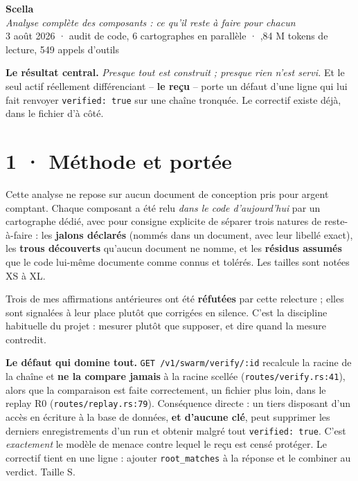 \documentclass[10pt]{article}
\newcommand{\sz}[1]{{\small\color{grey}\textsf{#1}}}
\newcommand{\code}[1]{\texttt{\small #1}}
\begin{document}
\begin{center}
{\Huge\bfseries\color{navy} Scella}\\[4pt]
{\large\color{grey}\itshape Analyse complète des composants : ce qu'il reste à faire pour chacun}\\[4pt]
{\small\color{grey} 3 août 2026 \; · \; audit de code, 6 cartographes en parallèle \; · ,84 M tokens de lecture, 549 appels d'outils}
\end{center}
\vspace{2pt}

\begin{these}
\textbf{Le résultat central.} \emph{Presque tout est construit ; presque rien n'est servi.} Et le seul
actif réellement différenciant -- \textbf{le reçu} -- porte un défaut d'une ligne qui lui fait renvoyer
\code{verified: true} sur une chaîne tronquée. Le correctif existe déjà, dans le fichier d'à côté.
\end{these}

\section{1 · Méthode et portée}

Cette analyse ne repose sur aucun document de conception pris pour argent comptant. Chaque composant a
été relu \emph{dans le code d'aujourd'hui} par un cartographe dédié, avec pour consigne explicite de
séparer trois natures de reste-à-faire : les \textbf{jalons déclarés} (nommés dans un document, avec
leur libellé exact), les \textbf{trous découverts} qu'aucun document ne nomme, et les \textbf{résidus
assumés} que le code lui-même documente comme connus et tolérés. Les tailles sont notées XS à XL.

Trois de mes affirmations antérieures ont été \textbf{réfutées} par cette relecture ; elles sont
signalées à leur place plutôt que corrigées en silence. C'est la discipline habituelle du projet :
mesurer plutôt que supposer, et dire quand la mesure contredit.

\begin{alerte}
\textbf{Le défaut qui domine tout.} \code{GET /v1/swarm/verify/:id} recalcule la racine de la chaîne et
\textbf{ne la compare jamais} à la racine scellée (\code{routes/verify.rs:41}), alors que la comparaison
est faite correctement, un fichier plus loin, dans le replay R0 (\code{routes/replay.rs:79}).
Conséquence directe : un tiers disposant d'un accès en écriture à la base de données, \textbf{et
d'aucune clé}, peut supprimer les derniers enregistrements d'un run et obtenir malgré tout
\code{verified: true}. C'est \emph{exactement} le modèle de menace contre lequel le reçu est censé
protéger. Le correctif tient en une ligne : ajouter \code{root\_matches} à la réponse et le combiner
au verdict. \sz{Taille S.}
\end{alerte}
\end{document}
